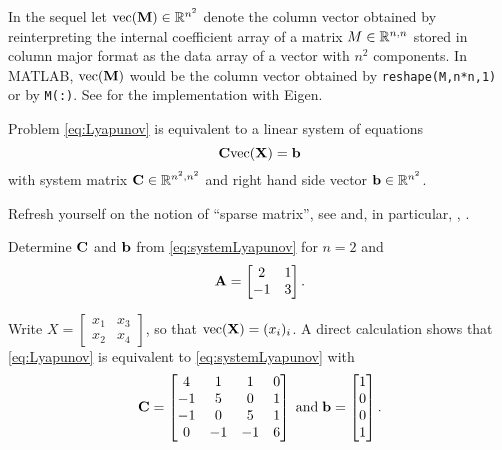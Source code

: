 \begin{problem}
In the sequel let ${\rm vec}(\vec{M})\in\R^{n^2}$ denote the column vector
obtained by reinterpreting the internal coefficient array of a matrix
$M\in\R^{n,n}$ stored in column major format as the data array of a vector with
$n^2$ components. In MATLAB, ${\rm vec}(\vec{M})$ would be the column vector
obtained by \texttt{reshape(M,n*n,1)} or by \texttt{M(:)}. See 
for the implementation with Eigen.

Problem \eqref{eq:Lyapunov} is equivalent to a linear system of equations
  \begin{equation}
    \label{eq:systemLyapunov}
   \VC{\rm vec}(\VX)=\Vb
  \end{equation}
with system matrix $\VC\in\R^{n^2,n^2}$ and right hand side vector $\Vb\in\R^{n^2}$.

\begin{subproblem}[1]\label{lpy:sp:0a}
  Refresh yourself on the notion of ``sparse matrix'', see  and,
  in particular, , . 
\end{subproblem}

\begin{subproblem}[1]
Determine $\VC$ and $\Vb$ from \eqref{eq:systemLyapunov} for $n=2$ and
\[
\VA=\begin{bmatrix}
2 & 1 \\ -1 & 3
\end{bmatrix}.
\]

\begin{solution}
Write $X=\left[ \begin{smallmatrix} x_1 & x_3 \\ x_2 & x_4 \end{smallmatrix} \right]$, so that ${\rm vec}(\VX)=(x_i)_i$. A direct calculation shows that \eqref{eq:Lyapunov} is equivalent to \eqref{eq:systemLyapunov} with
\[
\VC=
\begin{bmatrix}
4 & 1 & 1 & 0 \\
-1 & 5 & 0 & 1 \\
-1 & 0 & 5 & 1\\
0 & -1 & -1 & 6
\end{bmatrix} 
\;\text{and}\;
\Vb=
\begin{bmatrix}
1 \\
0 \\
0\\
1
\end{bmatrix}.
\]
\end{solution}
\end{subproblem}


\end{problem}

